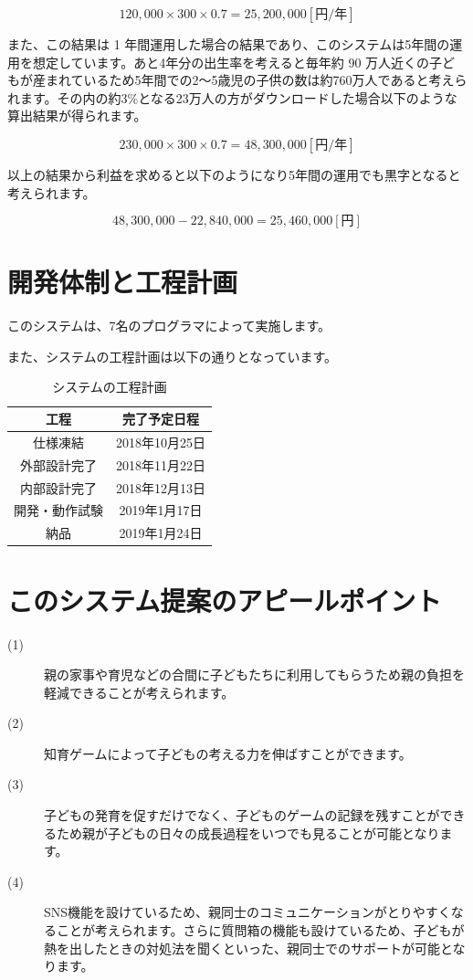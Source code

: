 \documentclass[a4j]{jarticle}
\begin{document}
\[
  120,000×300×0.7 = 25,200,000 [円/年]
\]

また、この結果は 1 年間運用した場合の結果であり、このシステムは5年間の運用を想定しています。あと4年分の出生率を考えると毎年約 90 万人近くの子どもが産まれているため5年間での2～5歳児の子供の数は約760万人であると考えられます。その内の約3\%となる23万人の方がダウンロードした場合以下のような算出結果が得られます。

\[
  230,000×300×0.7 = 48,300,000　[円/年]
\]

以上の結果から利益を求めると以下のようになり5年間の運用でも黒字となると考えられます。

\[
  48,300,000 - 22,840,000 = 25,460,000　[円]
\]


\section{開発体制と工程計画}
このシステムは、7名のプログラマによって実施します。\par
また、システムの工程計画は以下の通りとなっています。

\begin{table}[!h]
  \centering
  \caption{システムの工程計画}
  \begin{tabular}{|c|c|}
    \hline
    \multicolumn{1}{|c|}{工程} & \multicolumn{1}{c|}{完了予定日程} \\ \hline \hline
    仕様凍結 & 2018年10月25日  \\ \hline
    外部設計完了 & 2018年11月22日  \\ \hline
    内部設計完了 & 2018年12月13日 \\ \hline
    開発・動作試験 & 2019年1月17日  \\ \hline
    納品 & 2019年1月24日  \\ \hline
  \end{tabular}
\end{table}


\section{このシステム提案のアピールポイント}
\begin{description}
\item[(1)] 親の家事や育児などの合間に子どもたちに利用してもらうため親の負担を軽減できることが考えられます。
\item[(2)] 知育ゲームによって子どもの考える力を伸ばすことができます。

\item[(3)] 子どもの発育を促すだけでなく、子どものゲームの記録を残すことができるため親が子どもの日々の成長過程をいつでも見ることが可能となります。
\item[(4)] SNS機能を設けているため、親同士のコミュニケーションがとりやすくなることが考えられます。さらに質問箱の機能も設けているため、子どもが熱を出したときの対処法を聞くといった、親同士でのサポートが可能となります。
\end{description}
\end{document}
